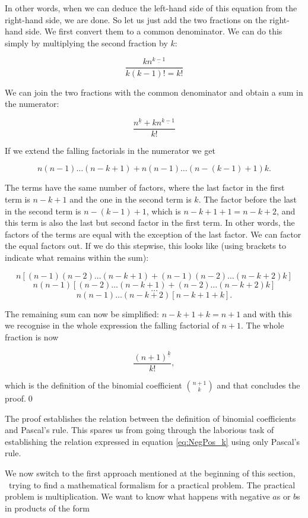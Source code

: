 \documentclass[tikz]{scrreprt}
\begin{document}
In other words, when we can deduce
the left-hand side of this equation
from the right-hand side, we are done.
So let us just add the two fractions on 
the right-hand side.
We first convert them to a common denominator.
We can do this simply by multiplying
the second fraction by $k$:

\[
\frac{kn^{\underline{k-1}}}{k(k-1)! = k!}
\]

We can join the two fractions with the common
denominator and obtain a sum in the numerator:

\[
\frac{n^{\underline{k}} + kn^{\underline{k-1}}}{k!}
\]

If we extend the falling factorials 
in the numerator we get

\[
n(n-1)\dots(n-k+1) + n(n-1)\dots(n-(k-1)+1)k. 
\]

The terms have the same number of factors,
where the last factor in the first term is $n-k+1$
and the one in the second term is $k$.
The factor before the last in the second term
is $n-(k-1)+1$, which is $n-k+1+1 = n-k+2$,
and this term is also the last but second factor
in the first term.
In other words, the factors of the terms are equal
with the exception of the last factor.
We can factor the equal factors out.
If we do this stepwise, this looks like
(using brackets to indicate what remains within
the sum):

\begin{minipage}{\textwidth}
\[
n[(n-1)(n-2)\dots (n-k+1) + (n-1)(n-2)\dots (n-k+2)k]
\]
\[
n(n-1)[(n-2)\dots (n-k+1) + (n-2)\dots (n-k+2)k]
\]
\[
\dots
\]
\[
n(n-1)\dots(n-k+2)[n-k+1+k].
\]
\end{minipage}

The remaining sum can now be simplified:
$n-k+1+k = n+1$ and with this 
we recognise in the whole expression
the falling factorial of $n+1$.
The whole fraction is now 

\[
\frac{(n+1)^{\underline{k}}}{k!},
\]

which is the definition of the binomial coefficient
$\binom{n+1}{k}$ and that concludes the proof.\qed

The proof establishes the relation between
the definition of binomial coefficients and
Pascal's rule. This spares us from going
through the laborious task of establishing
the relation expressed in equation \ref{eq:NegPos_k}
using only Pascal's rule.

We now switch to the first approach mentioned 
at the beginning of this section,
\ie\ trying to find a mathematical
formalism for a practical problem.
The practical problem is multiplication.
We want to know what happens
with negative $a$s or $b$s in products of the form
\end{document}
